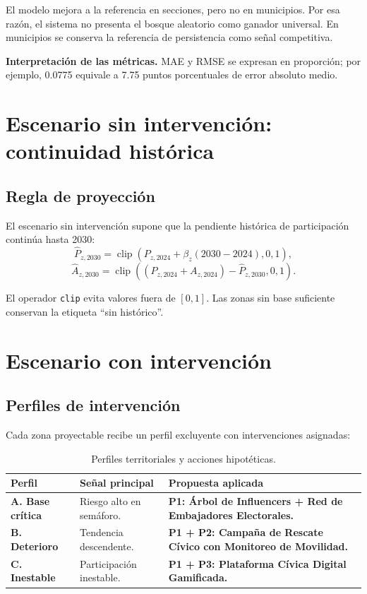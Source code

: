 \documentclass[11pt,a4paper]{article}
\begin{document}
El modelo mejora a la referencia en secciones, pero no en municipios. Por esa razón, el sistema no presenta el bosque aleatorio como ganador universal. En municipios se conserva la referencia de persistencia como señal competitiva.

\begin{advertencia}
\textbf{Interpretación de las métricas.} MAE y RMSE se expresan en proporción; por ejemplo, 0.0775 equivale a 7.75 puntos porcentuales de error absoluto medio.
\end{advertencia}

\section{Escenario sin intervención: continuidad histórica}

\subsection{Regla de proyección}

El escenario sin intervención supone que la pendiente histórica de participación continúa hasta 2030:
\[
\widehat{P}_{z,2030} = \operatorname{clip}\left(P_{z,2024} + \beta_z(2030-2024),0,1\right),
\]
\[
\widehat{A}_{z,2030} = \operatorname{clip}\left((P_{z,2024}+A_{z,2024}) - \widehat{P}_{z,2030},0,1\right).
\]

El operador \texttt{clip} evita valores fuera de $[0,1]$. Las zonas sin base suficiente conservan la etiqueta ``sin histórico''.

\section{Escenario con intervención}

\subsection{Perfiles de intervención}

Cada zona proyectable recibe un perfil excluyente con intervenciones asignadas:

\begin{table}[H]
\centering
\caption{Perfiles territoriales y acciones hipotéticas.}
\label{tab:perfiles}
\begin{tabularx}{\textwidth}{>{\bfseries}p{}p{}X}
\toprule
\textbf{Perfil} & \textbf{Señal principal} & \textbf{Propuesta aplicada}\\
\midrule
A. Base crítica & Riesgo alto en semáforo. & \textbf{P1: Árbol de Influencers + Red de Embajadores Electorales.}\\
B. Deterioro & Tendencia descendente. & \textbf{P1 + P2: Campaña de Rescate Cívico con Monitoreo de Movilidad.}\\
C. Inestable & Participación inestable. & \textbf{P1 + P3: Plataforma Cívica Digital Gamificada.}\\
\bottomrule
\end{tabularx}
\end{table}
\end{document}
